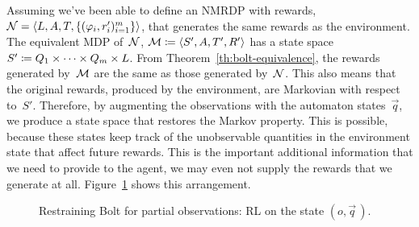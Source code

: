 Assuming we've been able to define an NMRDP with \ldl{} rewards, $\mathcal{N} =
\langle L, A, T, \{(\varphi_i, r_i')_{i=1}^m\} \rangle$, that
generates the same rewards as the environment. The equivalent MDP
of~$\mathcal{N}$, $\mathcal{M} \coloneqq \langle S', A, T', R' \rangle$ has a state
space $S' \coloneqq Q_1 \times \dots \times Q_m \times L$. From
Theorem~\ref{th:bolt-equivalence}, the rewards generated by~$\mathcal{M}$ are the
same as those generated by~$\mathcal{N}$.  This also means that the original
rewards, produced by the environment, are Markovian with respect to~$S'$.
Therefore, by augmenting the observations with the automaton states~$\vec{q}$,
we produce a state space that restores the Markov property.  This is possible,
because these states keep track of the unobservable quantities in the
environment state that affect future rewards. This is the important additional
information that we need to provide to the agent, we may even not supply the
rewards that we generate at all. Figure~\ref{fig:rb-partial-obs} shows this
arrangement.
\begin{figure}
	\centering
	\caption{Restraining Bolt for partial observations: RL on the state
	$(o, \vec{q}\,)$.}
	\label{fig:rb-partial-obs}
\end{figure}

